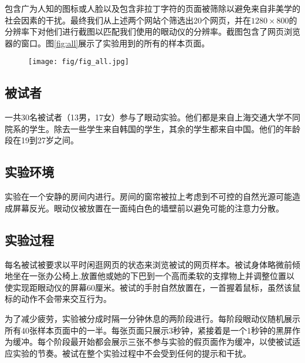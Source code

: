 

包含广为人知的图标或人脸以及包含非拉丁字符的页面被筛除以避免来自非美学的社会因素的干扰。最终我们从上述两个网站个筛选出20个网页，并在$1280\times800$的分辨率下对他们进行截图以匹配我们使用的眼动仪的分辨率。截图包含了网页浏览器的窗口。图\ref{fig:all}展示了实验用到的所有的样本页面。

\begin{figure}
  \centering
  \texttt{[image: fig/fig\_all.jpg]}
\end{figure}

\subsection{被试者}
一共30名被试者（13男，17女）参与了眼动实验。他们都是来自上海交通大学不同院系的学生。除去一些学生来自韩国的学生，其余的学生都来自中国。他们的年龄段在19到27岁之间。

\subsection{实验环境}
实验在一个安静的房间内进行。房间的窗帘被拉上考虑到不可控的自然光源可能造成屏幕反光。眼动仪被放置在一面纯白色的墙壁前以避免可能的注意力分散。

\subsection{实验过程}
每名被试被要求以平时闲逛网页的状态来浏览被试的网页样本。被试身体略微前倾地坐在一张办公椅上,放置他或她的下巴到一个高而柔软的支撑物上并调整位置以使实现距眼动仪的屏幕60厘米。被试的手肘自然放置在，一首握着鼠标，虽然该鼠标的动作不会带来交互行为。

为了减少疲劳，实验被分成时隔一分钟休息的两阶段进行。每阶段眼动仪随机展示所有40张样本页面中的一半。每张页面只展示3秒钟，紧接着是一个1秒钟的黑屏作为缓冲。每个阶段最开始都会展示三张不参与实验的假页面作为缓冲，以使被试适应实验的节奏。被试在整个实验过程中不会受到任何的提示和干扰。

